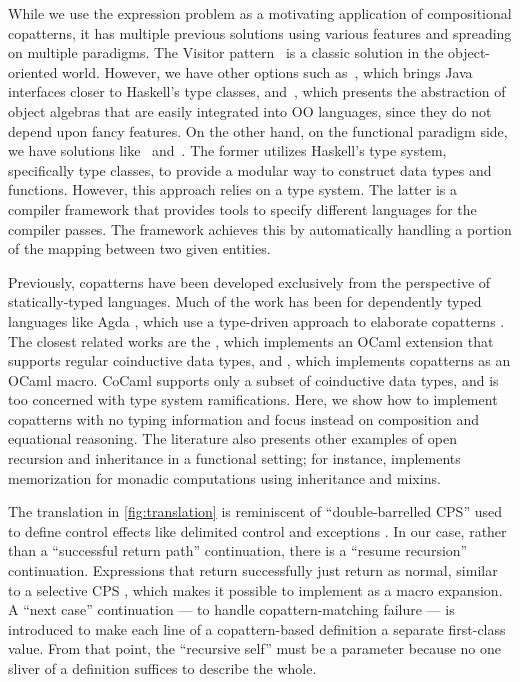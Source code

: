 While we use the expression problem as a motivating application of compositional copatterns, it has multiple previous solutions using various features and spreading on multiple paradigms.
The Visitor pattern~\cite{GangOfFour} is a classic solution in the object-oriented world.
However, we have other options such as~\cite{wehr_javagi_2011}, which brings Java interfaces closer to Haskell's type classes, and~\cite{hutchison_extensibility_2012}, which presents the abstraction of object algebras that are easily integrated into OO languages, since they do not depend upon fancy features.
On the other hand, on the functional paradigm side, we have solutions like~\cite{swierstra_data_2008} and~\cite{keep_nanopass_2013}.
The former utilizes Haskell's type system, specifically type classes, to provide a modular way to construct data types and functions.
However, this approach relies on a type system.
The latter is a compiler framework that provides tools to specify different languages for the compiler passes. The framework achieves this by automatically handling a portion of the mapping between two given entities.

Previously, copatterns have been developed exclusively from the perspective of statically-typed languages.
Much of the work has been for dependently typed languages like Agda \cite{ElaboratingDependentCopatterns}, which use a type-driven approach to elaborate copatterns \cite{UnnestingCopatterns,ThibodeauMasters}.
The closest related works are the \cite{jeannin_cocaml_2017}, which implements an OCaml extension that supports regular coinductive data types, and \cite{LaforgueR17}, which implements copatterns as an OCaml macro.
CoCaml\cite{jeannin_cocaml_2017} supports only a subset of coinductive data types, and \cite{LaforgueR17} is too concerned with type system ramifications.
Here, we show how to implement copatterns with no typing information and focus instead on composition and equational reasoning.
The literature also presents other examples of open recursion and inheritance in a functional setting; for instance, \cite{Brown2009FunctionI} implements memorization for monadic computations using inheritance and mixins.

The translation in \cref{fig:translation} is reminiscent of ``double-barrelled CPS'' \cite{DoubleBarrelCPS} used to define control effects like delimited control \cite{AbstractingControl} and exceptions \cite{KimYiDanvy98}.
In our case, rather than a ``successful return path'' continuation, there is a ``resume recursion'' continuation.
Expressions that return successfully just return as normal, similar to a selective CPS \cite{SelectiveCPS}, which makes it possible to implement as a macro expansion.
A ``next case'' continuation --- to handle copattern-matching failure --- is introduced to make each line of a copattern-based definition a separate first-class value.
From that point, the ``recursive self'' must be a parameter because no one sliver of a definition suffices to describe the whole.

